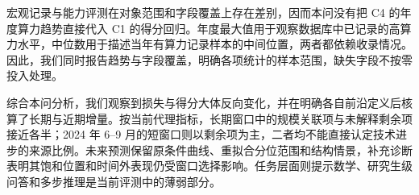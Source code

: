 宏观记录与能力评测在对象范围和字段覆盖上存在差别，因而本问没有把 C4 的年度算力趋势直接代入 C1 的得分回归。年度最大值用于观察数据库中已记录的高算力水平，中位数用于描述当年有算力记录样本的中间位置，两者都依赖收录情况。因此，我们同时报告趋势与字段覆盖，明确各项统计的样本范围，缺失字段不按零投入处理。

综合本问分析，我们观察到损失与得分大体反向变化，并在明确各自前沿定义后核算了长期与近期增量。按当前代理指标，长期窗口中的规模关联项与未解释剩余项接近各半；2024 年 6--9 月的短窗口则以剩余项为主，二者均不能直接认定技术进步的来源比例。未来预测保留原条件曲线、重拟合分位范围和结构情景，补充诊断表明其饱和位置和时间外表现仍受窗口选择影响。任务层面则提示数学、研究生级问答和多步推理是当前评测中的薄弱部分。

\FloatBarrier
\endgroup
